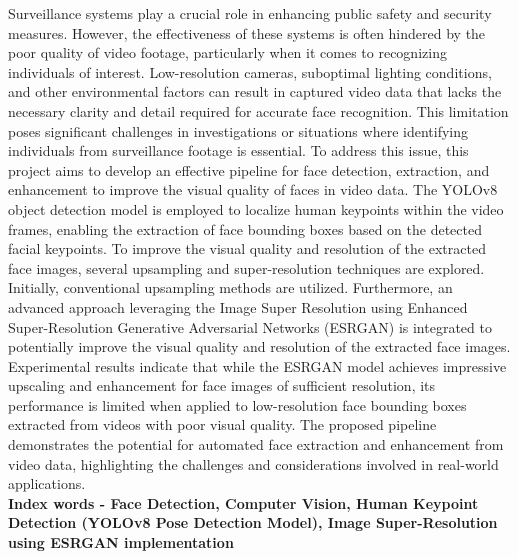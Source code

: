 Surveillance systems play a crucial role in enhancing public safety and security measures. However, the effectiveness of these systems is often hindered by the poor quality of video footage, particularly when it comes to recognizing individuals of interest. Low-resolution cameras, suboptimal lighting conditions, and other environmental factors can result in captured video data that lacks the necessary clarity and detail required for accurate face recognition. This limitation poses significant challenges in investigations or situations where identifying individuals from surveillance footage is essential.
To address this issue, this project aims to develop an effective pipeline for face detection, extraction, and enhancement to improve the visual quality of faces in video data. The YOLOv8 object detection model is employed to localize human keypoints within the video frames, enabling the extraction of face bounding boxes based on the detected facial keypoints. To improve the visual quality and resolution of the extracted face images, several upsampling and super-resolution techniques are explored. Initially, conventional upsampling methods are utilized. Furthermore, an advanced approach leveraging the Image Super Resolution using Enhanced Super-Resolution Generative Adversarial Networks (ESRGAN) is integrated to potentially improve the visual quality and resolution of the extracted face images. Experimental results indicate that while the ESRGAN model achieves impressive upscaling and enhancement for face images of sufficient resolution, its performance is limited when applied to low-resolution face bounding boxes extracted from videos with poor visual quality. The proposed pipeline demonstrates the potential for automated face extraction and enhancement from video data, highlighting the challenges and considerations involved in real-world applications.\\

\textbf{Index words - Face Detection, Computer Vision, Human Keypoint Detection (YOLOv8 Pose Detection Model), Image Super-Resolution using ESRGAN implementation\\}
